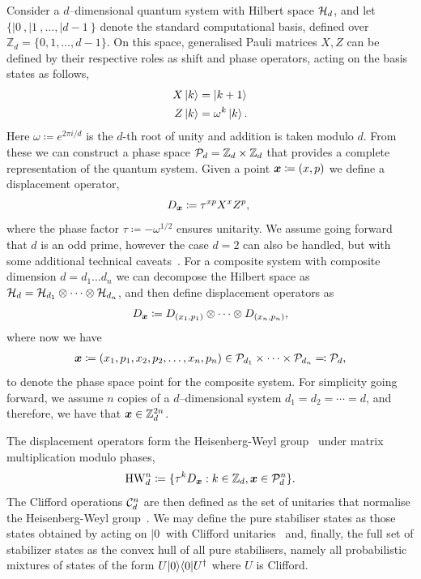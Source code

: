 \documentclass[pra,
aps,
twocolumn,
superscriptaddress,
groupedaddress,
nofootinbib,
reprint
]{revtex4-1}
\begin{document}
Consider a $d$--dimensional quantum system with Hilbert space $\H_d$, and let $\{ |0\>, |1\>, \dots , |d-1\>\}$ denote the standard computational basis, defined over $\mathbb{Z}_d = \{ 0, 1, \dots,d-1 \}$. On this space, generalised Pauli matrices $X, Z$ can be defined by their respective roles as shift and phase operators, acting on the basis states as follows,
\begin{align}
    X \ket{k} &= \ket{k + 1} \label{eq:xpauli}\\
	Z \ket{k} &= \omega^k \ket{k}. \label{eq:zpauli}
\end{align}
Here $\omega \coloneqq e^{2\pi i/d}$ is the $d$-th root of unity and addition is taken modulo $d$. From these we can construct a phase space $\cal{P}_d = \mathbb{Z}_d \times \mathbb{Z}_d$ that provides a complete representation of the quantum system. Given a point $\bmx \coloneqq (x, p)$ we define a displacement operator, 
\begin{equation}\label{eq:ddef}
    D_{\bmx} \coloneqq \tau^{x p} X^{x} Z^{p},\ 
\end{equation}
where the phase factor $\tau \coloneqq -\omega^{1/2}$ ensures unitarity. We assume going forward that $d$ is an odd prime, however the case $d=2$ can also be handled, but with some additional technical caveats~\cite{Appleby_2005}. For a composite system with composite dimension $d = d_1 \dots d_n$ we can decompose the Hilbert space as $\cal{H}_d = \cal{H}_{d_1} \otimes \dots \otimes \cal{H}_{d_n}$, and then define displacement operators as
\begin{equation}\label{eq:composited}
    D_{\bmx} \coloneqq D_{(x_1, p_1)} \otimes \dots \otimes D_{(x_n, p_n)},
\end{equation}
where now we have
\begin{align*}
	\bmx \coloneqq (x_1, p_1, x_2, p_2, \dots, x_n, p_n) \in \cal{P}_{d_1} \times \dots \times \cal{P}_{d_n} \eqqcolon  \cal{P}_d,
\end{align*}
to denote the phase space point for the composite system. 
For simplicity going forward, we assume $n$ copies of a $d$--dimensional system $d_1=d_2 = \cdots = d$, and therefore, we have that $\x \in \mathbb{Z}_d^{2n}$.


The displacement operators form the Heisenberg-Weyl group~\cite{Folland_1989, Bengtsson_2006} under matrix multiplication modulo phases,
\begin{equation}\label{eq:gp}
    {\rm{HW}}_d^n \coloneqq \{ \tau^k D_{\bmx}: k \in \mathbb{Z}_d, \bmx \in \cal{P}_d^n\}.
\end{equation}
The Clifford operations $ \cal{C}_d^n $ are then defined as the set of unitaries that normalise the Heisenberg-Weyl group~\cite{Appleby_2005}. We may define the pure stabiliser states as those states obtained by acting on $|0\>$ with Clifford unitaries~\cite{cit:gross3} and, finally, the full set of stabilizer states as the convex hull of all pure stabilisers, namely all probabilistic mixtures of states of the form $U|0\>\<0|U^\dagger$ where $U$ is Clifford. 
\end{document}
